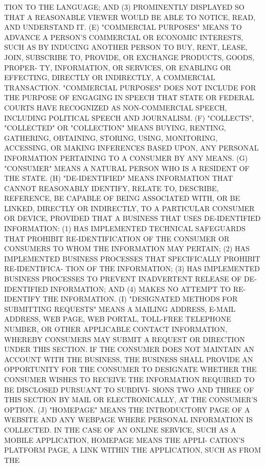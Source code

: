  TION TO THE LANGUAGE; AND (3) PROMINENTLY DISPLAYED SO THAT A REASONABLE
 VIEWER WOULD BE ABLE TO NOTICE, READ, AND UNDERSTAND IT.
   (E)  "COMMERCIAL  PURPOSES"  MEANS TO ADVANCE A PERSON'S COMMERCIAL OR
 ECONOMIC INTERESTS, SUCH AS BY INDUCING ANOTHER  PERSON  TO  BUY,  RENT,
 LEASE, JOIN, SUBSCRIBE TO, PROVIDE, OR EXCHANGE PRODUCTS, GOODS, PROPER-
 TY,  INFORMATION,  OR  SERVICES,  OR  ENABLING OR EFFECTING, DIRECTLY OR
 INDIRECTLY, A COMMERCIAL TRANSACTION.  "COMMERCIAL  PURPOSES"  DOES  NOT
 INCLUDE  FOR  THE  PURPOSE  OF  ENGAGING IN SPEECH THAT STATE OR FEDERAL
 COURTS HAVE RECOGNIZED AS  NON-COMMERCIAL  SPEECH,  INCLUDING  POLITICAL
 SPEECH AND JOURNALISM.
   (F)  "COLLECTS",  "COLLECTED"  OR  "COLLECTION" MEANS BUYING, RENTING,
 GATHERING, OBTAINING, STORING, USING, MONITORING, ACCESSING,  OR  MAKING
 INFERENCES BASED UPON, ANY PERSONAL INFORMATION PERTAINING TO A CONSUMER
 BY ANY MEANS.
   (G) "CONSUMER" MEANS A NATURAL PERSON WHO IS A RESIDENT OF THE STATE.
   (H) "DE-IDENTIFIED" MEANS INFORMATION THAT CANNOT REASONABLY IDENTIFY,
 RELATE  TO, DESCRIBE, REFERENCE, BE CAPABLE OF BEING ASSOCIATED WITH, OR
 BE LINKED, DIRECTLY OR INDIRECTLY, TO A PARTICULAR CONSUMER  OR  DEVICE,
 PROVIDED  THAT  A  BUSINESS THAT USES DE-IDENTIFIED INFORMATION: (1) HAS
 IMPLEMENTED TECHNICAL SAFEGUARDS THAT PROHIBIT RE-IDENTIFICATION OF  THE
 CONSUMER  OR  CONSUMERS  TO  WHOM  THE  INFORMATION MAY PERTAIN; (2) HAS
 IMPLEMENTED BUSINESS PROCESSES THAT SPECIFICALLY PROHIBIT RE-IDENTIFICA-
 TION OF THE INFORMATION;  (3)  HAS  IMPLEMENTED  BUSINESS  PROCESSES  TO
 PREVENT  INADVERTENT RELEASE OF DE-IDENTIFIED INFORMATION; AND (4) MAKES
 NO ATTEMPT TO RE-IDENTIFY THE INFORMATION.
   (I) "DESIGNATED METHODS  FOR  SUBMITTING  REQUESTS"  MEANS  A  MAILING
 ADDRESS,  E-MAIL  ADDRESS,  WEB  PAGE,  WEB  PORTAL, TOLL-FREE TELEPHONE
 NUMBER, OR OTHER APPLICABLE CONTACT INFORMATION, WHEREBY  CONSUMERS  MAY
 SUBMIT  A  REQUEST OR DIRECTION UNDER THIS SECTION. IF THE CONSUMER DOES
 NOT MAINTAIN AN ACCOUNT WITH THE BUSINESS, THE BUSINESS SHALL PROVIDE AN
 OPPORTUNITY FOR THE CONSUMER TO DESIGNATE WHETHER THE CONSUMER WISHES TO
 RECEIVE THE INFORMATION REQUIRED TO BE DISCLOSED  PURSUANT  TO  SUBDIVI-
 SIONS  TWO  AND  THREE OF THIS SECTION BY MAIL OR ELECTRONICALLY, AT THE
 CONSUMER'S OPTION.
   (J) "HOMEPAGE" MEANS THE  INTRODUCTORY  PAGE  OF  A  WEBSITE  AND  ANY
 WEBPAGE  WHERE  PERSONAL  INFORMATION  IS  COLLECTED.  IN THE CASE OF AN
 ONLINE SERVICE, SUCH AS A MOBILE APPLICATION, HOMEPAGE MEANS THE  APPLI-
 CATION'S  PLATFORM PAGE, A LINK WITHIN THE APPLICATION, SUCH AS FROM THE
